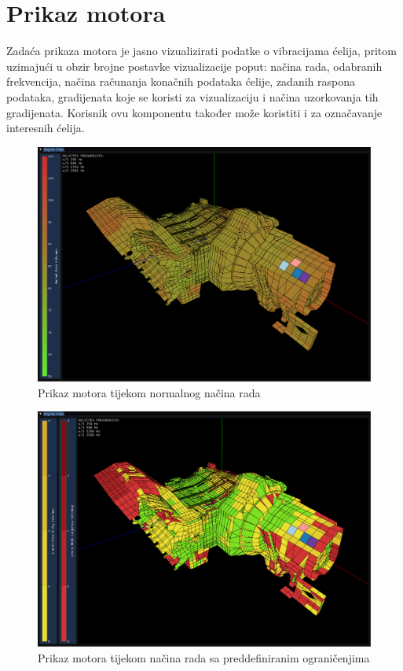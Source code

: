 \documentclass[times, utf8, diplomski]{fer}
\begin{document}
\section{Prikaz motora} \label{engine-view-section}
Zadaća prikaza motora je jasno vizualizirati podatke o vibracijama ćelija, pritom uzimajući u obzir brojne postavke vizualizacije poput: načina rada, odabranih frekvencija, načina računanja konačnih podataka ćelije, zadanih raspona podataka, gradijenata koje se koristi za vizualizaciju i načina uzorkovanja tih gradijenata. Korisnik ovu komponentu također može koristiti i za označavanje interesnih ćelija.\\
\begin{figure}[H]
\centering
\includegraphics[width=0.85\linewidth]{engine_view_normal_mode.png}
\caption{Prikaz motora tijekom normalnog načina rada}
\label{fig:normal-mode-engine-view}
\end{figure}
\begin{figure}[h]
\centering
\includegraphics[width=0.85\linewidth]{engine_view_limits.png}
\caption{Prikaz motora tijekom načina rada sa preddefiniranim ograničenjima}
\label{fig:limits-mode-engine-view}
\end{figure}
\end{document}
